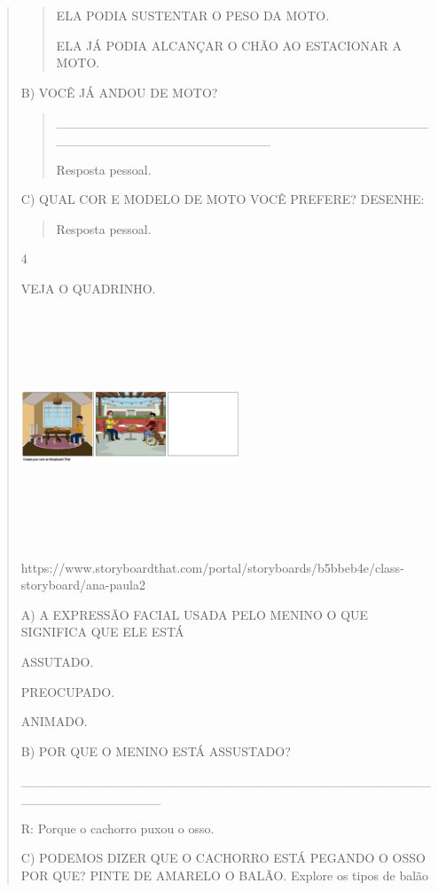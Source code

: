 {{{{\begin{verse}
{{\begin{escolha}
{{{{{\begin{quote}
ELA PODIA SUSTENTAR O PESO DA MOTO.

ELA JÁ PODIA ALCANÇAR O CHÃO AO ESTACIONAR A MOTO.
\end{quote}

B) VOCÊ JÁ ANDOU DE MOTO?

\begin{quote}
\_\_\_\_\_\_\_\_\_\_\_\_\_\_\_\_\_\_\_\_\_\_\_\_\_\_\_\_\_\_\_\_\_\_\_\_\_\_\_\_\_\_\_\_\_\_\_\_\_\_\_\_\_\_\_\_\_\_\_\_\_\_\_

Resposta pessoal.
\end{quote}

C) QUAL COR E MODELO DE MOTO VOCÊ PREFERE? DESENHE:

\begin{quote}
Resposta pessoal.
\end{quote}

\num{4}

VEJA O QUADRINHO.

\includegraphics[width=2.57222in,height=2.73403in]{media/image131.png}

https://www.storyboardthat.com/portal/storyboards/b5bbeb4e/class-storyboard/ana-paula2

A) A EXPRESSÃO FACIAL USADA PELO MENINO O QUE SIGNIFICA QUE ELE ESTÁ

ASSUTADO.

PREOCUPADO.

ANIMADO.

B) POR QUE O MENINO ESTÁ ASSUSTADO?

\_\_\_\_\_\_\_\_\_\_\_\_\_\_\_\_\_\_\_\_\_\_\_\_\_\_\_\_\_\_\_\_\_\_\_\_\_\_\_\_\_\_\_\_\_\_\_\_\_\_\_\_\_\_\_\_\_\_\_

R: Porque o cachorro puxou o osso.

C) PODEMOS DIZER QUE O CACHORRO ESTÁ PEGANDO O OSSO POR QUE? PINTE DE
AMARELO O BALÃO. Explore os tipos de balão

}}}}}
\end{escolha}}}
\end{verse}}}}}
